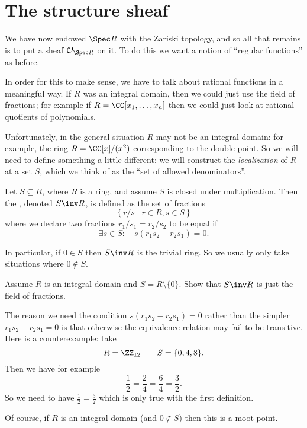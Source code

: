 \documentclass[11pt]{scrreprt}
\begin{document}
\section{The structure sheaf}

We have now endowed $\Spec R$ with the Zariski topology,
and so all that remains is to put a sheaf $\OO_{\Spec R}$ on it.
To do this we want a notion of ``regular functions'' as before.

In order for this to make sense, we have to talk about rational
functions in a meaningful way.
If $R$ was an integral domain, then we could just use the field of fractions;
for example if $R = \CC[x_1, \dots, x_n]$ then we could just
look at rational quotients of polynomials.

Unfortunately, in the general situation $R$ may not be an integral domain:
for example, the ring $R = \CC[x] / (x^2)$ corresponding to the double point.
So we will need to define something a little different:
we will construct the \emph{localization} of $R$ at a set $S$,
which we think of as the ``set of allowed denominators''.

\begin{definition}
	Let $S \subseteq R$, where $R$ is a ring,
	and assume $S$ is closed under multiplication.
	Then the , denoted $S\inv R$,
	is defined as the set of fractions
	\[ \left\{ r/s \mid r \in R, s \in S \right\} \]
	where we declare two fractions $r_1 / s_1 = r_2 / s_2$ 
	to be equal if 
	\[ \exists s \in S : \quad s(r_1s_2 - r_2s_1) = 0. \]
\end{definition}
In particular, if $0 \in S$ then $S\inv R$ is the trivial ring.
So we usually only take situations where $0 \notin S$.
\begin{ques}
	Assume $R$ is an integral domain and $S = R \setminus \{0\}$.
	Show that $S\inv R$ is just the field of fractions.
\end{ques}

\begin{example}
	The reason we need the condition $s(r_1s_2 - r_2s_1) = 0$
	rather than the simpler $r_1s_2 - r_2s_1 = 0$ is that
	otherwise the equivalence relation may fail to be transitive.
	Here is a counterexample: take
	\[ R = \Zc{12} \qquad S = \{ 0, 4, 8 \}. \]
	Then we have for example
	\[ \frac12 = \frac24 = \frac64 = \frac32. \]
	So we need to have $\frac12=\frac32$ which is only true
	with the first definition.

	Of course, if $R$ is an integral domain (and $0\notin S$)
	then this is a moot point.
\end{example}
\end{document}
